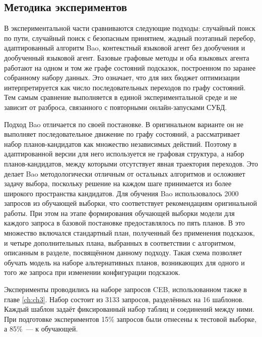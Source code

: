 \subsection{Методика экспериментов}\label{subsec:ch4_methodology}

В экспериментальной части сравниваются следующие подходы: случайный поиск по пути, случайный поиск с безопасным принятием, жадный поэтапный перебор, адаптированный алгоритм Bao, контекстный языковой агент без дообучения и дообученный языковой агент. Базовые графовые методы и оба языковых агента работают на одном и том же графе состояний подсказок, построенном по заранее собранному набору данных. Это означает, что для них бюджет оптимизации интерпретируется как число последовательных переходов по графу состояний. Тем самым сравнение выполняется в единой экспериментальной среде и не зависит от разброса, связанного с повторными онлайн-запусками СУБД.

Подход Bao отличается по своей постановке. В оригинальном варианте он не выполняет последовательное движение по графу состояний, а рассматривает набор планов-кандидатов как множество независимых действий. Поэтому в адаптированной версии для него используется не графовая структура, а набор планов-кандидатов, между которыми отсутствует явная траектория переходов. Это делает Bao методологически отличным от остальных алгоритмов и осложняет задачу выбора, поскольку решение на каждом шаге принимается из более широкого пространства кандидатов. 
Для обучения Bao использовалось 2000 запросов из обучающей выборки, что соответствует рекомендациям оригинальной работы. При этом на этапе формирования обучающей выборки модели для каждого запроса в базовой постановке предоставлялось по пять планов. В это множество включался стандартный план, полученный без применения подсказок, и четыре дополнительных плана, выбранных в соответствии с алгоритмом, описанным в разделе, посвящённом данному подходу. Такая схема позволяет обучать модель на наборе альтернативных планов, возникающих для одного и того же запроса при изменении конфигурации подсказок.

Эксперименты проводились на наборе запросов CEB, использованном также в главе \cref{ch:ch3}. Набор состоит из 3133 запросов, разделённых на 16 шаблонов. Каждый шаблон задаёт фиксированный набор таблиц и соединений между ними. При подготовке экспериментов 15\% запросов были отнесены к тестовой выборке, а 85\%~--- к обучающей.

